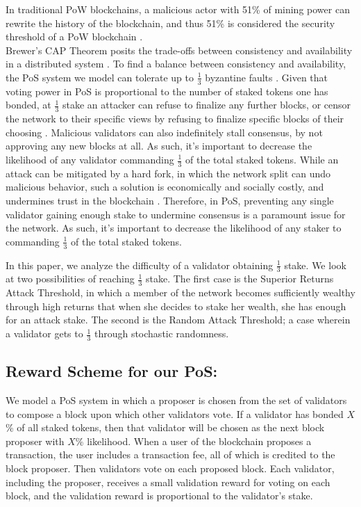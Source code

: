 \documentclass{article}
\renewcommand{\|}{\;|\;}
\begin{document}
In traditional PoW blockchains, a malicious actor with 51\% of mining power can rewrite the history of the blockchain, and thus 51\% is considered the security threshold of a PoW blockchain \cite{nakamoto2008}. \\ 

\noindent Brewer's CAP Theorem posits the trade-offs between consistency and availability in a distributed system \cite{Brewer}. To find a balance between consistency and availability, the PoS system we model can tolerate up to $\frac{1}{3}$ byzantine faults \cite{Brewer}. Given that voting power in PoS is proportional to the number of staked tokens one has bonded, at $\frac{1}{3}$ stake an attacker can refuse to finalize any further blocks, or censor the network to their specific views by refusing to finalize specific blocks of their choosing \cite{EthPoSFAQ}.  Malicious validators can also indefinitely stall consensus, by not approving any new blocks at all. As such, it's important to decrease the likelihood of any validator commanding $\frac{1}{3}$ of the total staked tokens. While an attack can be mitigated by a hard fork, in which the network split can undo malicious behavior, such a solution is economically and socially costly, and undermines trust in the blockchain \cite{Buterin2016}. Therefore, in PoS, preventing any single validator gaining enough stake to undermine consensus is a paramount issue for the network. As such, it's important to decrease the likelihood of any staker to commanding $\frac{1}{3}$ of the total staked tokens. \newline 
 
\noindent In this paper, we analyze the difficulty of a validator obtaining $\frac{1}{3}$ stake. We look at two possibilities of reaching $\frac{1}{3}$ stake. The first case is the Superior Returns Attack Threshold, in which a member of the network becomes sufficiently wealthy through high returns that when she decides to stake her wealth, she has enough for an attack stake. The second is the Random Attack Threshold; a case wherein a validator gets to $\frac{1}{3}$ through stochastic randomness. 

\subsection*{Reward Scheme for our PoS:}
We model a PoS system in which a proposer is chosen from the set of validators to compose a block upon which other validators vote. If a validator has bonded $X$\% of all staked tokens, then that validator will be chosen as the next block proposer with $X$\% likelihood. When a user of the blockchain proposes a transaction, the user includes a transaction fee, all of which is credited to the block proposer. Then validators vote on each proposed block. Each validator, including the proposer, receives a small validation reward for voting on each block, and the validation reward is proportional to the validator's stake. \\
\end{document}
